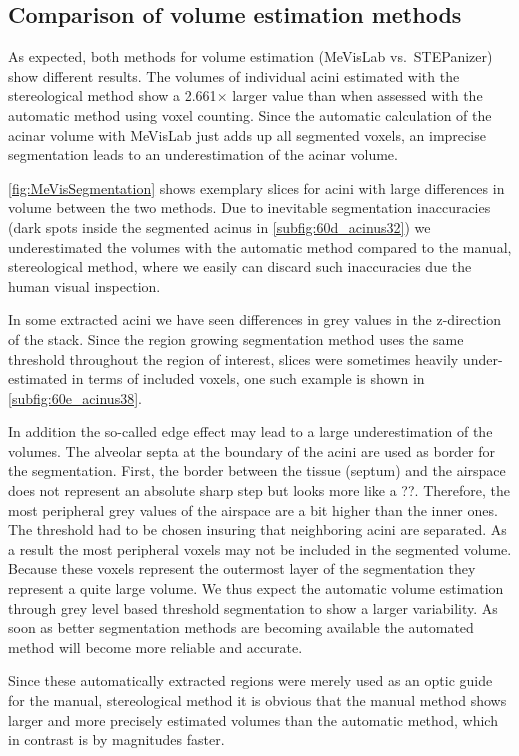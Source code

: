 \documentclass[a4paper,DIV=calc,abstract,english]{scrartcl}
\newcommand{\difference}{2.661} %
\begin{document}
\subsection{Comparison of volume estimation methods}
As expected, both methods for volume estimation (MeVisLab vs.\ STEPanizer) show different results.
The volumes of individual acini estimated with the stereological method show a \difference\(\times\) larger value than when assessed with the automatic method using voxel counting.
Since the automatic calculation of the acinar volume with MeVisLab just adds up all segmented voxels, an imprecise segmentation leads to an underestimation of the acinar volume.

\autoref{fig:MeVisSegmentation} shows exemplary slices for acini with large differences in volume between the two methods.
Due to inevitable segmentation inaccuracies (dark spots inside the segmented acinus in \autoref{subfig:60d_acinus32}) we underestimated the volumes with the automatic method compared to the manual, stereological method, where we easily can discard such inaccuracies due the human visual inspection.

In some extracted acini we have seen differences in grey values in the z-direction of the stack.
Since the region growing segmentation method uses the same threshold throughout the region of interest, slices were sometimes heavily under-estimated in terms of included voxels, one such example is shown in \autoref{subfig:60e_acinus38}.

In addition the so-called edge effect may lead to a large underestimation of the volumes.
The alveolar septa at the boundary of the acini are used as border for the segmentation.
First, the border between the tissue (septum) and the airspace does not represent an absolute sharp step but looks more like a ??.
Therefore, the most peripheral grey values of the airspace are a bit higher than the inner ones.
The threshold had to be chosen insuring that neighboring acini are separated.
As a result the most peripheral voxels may not be included in the segmented volume.
Because these voxels represent the outermost layer of the segmentation they represent a quite large volume.
We thus expect the automatic volume estimation through grey level based threshold segmentation to show a larger variability.
As soon as better segmentation methods are becoming available the automated method will become more reliable and accurate.

Since these automatically extracted regions were merely used as an optic guide for the manual, stereological method it is obvious that the manual method shows larger and more precisely estimated volumes than the automatic method, which in contrast is by magnitudes faster.
\end{document}
